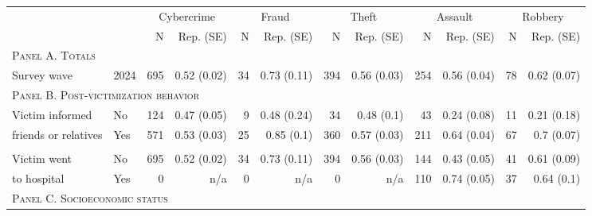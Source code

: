 \begin{tabular}{p{1.3in}p{1.1in}rrrrrrrrrr}
	\toprule
	&  & \multicolumn{2}{c}{Cybercrime    } & \multicolumn{2}{c}{Fraud    } & \multicolumn{2}{c}{Theft    } & \multicolumn{2}{c}{Assault    } & \multicolumn{2}{c}{Robbery} \\ 
	\cmidrule(lr){3-4} \cmidrule(lr){5-6} \cmidrule(lr){7-8} \cmidrule(lr){9-10} \cmidrule(lr){11-12}
	&     & N & Rep. (SE) & N  & Rep. (SE)  & N   & Rep. (SE)   & N    & Rep. (SE)    & N     & Rep. (SE)     \\ 
	\multicolumn{12}{l}{\textsc{Panel A. Totals}} \\
	Survey wave & 2024 & 695 & 0.52 (0.02) & 34 & 0.73 (0.11) & 394 & 0.56 (0.03) & 254 & 0.56 (0.04) & 78 & 0.62 (0.07) \\  
	\midrule
	\multicolumn{12}{l}{\textsc{Panel B. Post-victimization behavior}} \\

	Victim informed  
	& No & 124 & 0.47 (0.05) & 9 & 0.48 (0.24) & 34 & 0.48 (0.1) & 43 & 0.24 (0.08) & 11 & 0.21 (0.18) \\ 
	friends or relatives & Yes & 571 & 0.53 (0.03) & 25 & 0.85 (0.1) & 360 & 0.57 (0.03) & 211 & 0.64 (0.04) & 67 & 0.7 (0.07) \\ 
	
	\vspace{1pt}\\
	Victim went & No & 695 & 0.52 (0.02) & 34 & 0.73 (0.11) & 394 & 0.56 (0.03) & 144 & 0.43 (0.05) & 41 & 0.61 (0.09) \\ 
	to hospital & Yes & 0 & n/a & 0 & n/a & 0 & n/a & 110 & 0.74 (0.05) & 37 & 0.64 (0.1) \\  
	\midrule
	\multicolumn{12}{l}{\textsc{Panel C. Socioeconomic status}} \\


\end{tabular}
